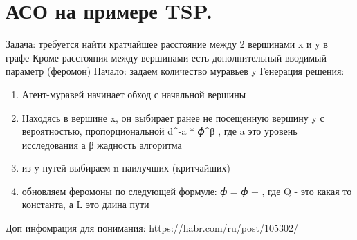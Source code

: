 \section{АСО на примере TSP.}
Задача: требуется найти кратчайшее расстояние между 2 вершинами x и y в графе
Кроме расстояния между вершинами есть дополнительный вводимый параметр \phi (феромон)
Начало: задаем количество муравьев y 
Генерация решения:
\begin{enumerate} 
	\item Агент-муравей начинает обход с начальной вершины
	\item Находясь в вершине x, он выбирает ранее не посещенную вершину y с вероятностью, пропорциональной d^-a * 𝜙^β , где a это уровень исследования а β жадность алгоритма
	\item из y путей выбираем n наилучших (критчайших)
	\item обновляем феромоны по следующей формуле: 𝜙 = 𝜙 +  , где Q - это какая то константа, а L это длина пути
\end{enumerate}
Доп инфомрация для понимания: https://habr.com/ru/post/105302/

